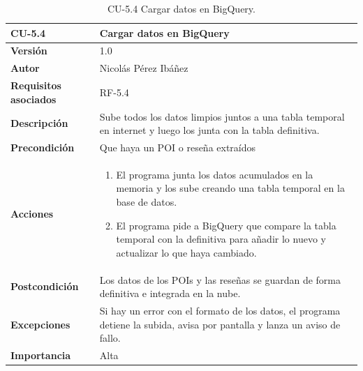 \begin{table}[p]
	\centering
	\begin{tabularx}{\linewidth}{ p{} p{} }
		\toprule
		\textbf{CU-5.4}  & \textbf{Cargar datos en BigQuery}\\
		\toprule
		\textbf{Versión}              & 1.0    \\
		\textbf{Autor}                & Nicolás Pérez Ibáñez \\
		\textbf{Requisitos asociados} & RF-5.4 \\
		\textbf{Descripción}          & Sube todos los datos limpios juntos a una tabla temporal en internet y luego los junta con la tabla definitiva. \\
		\textbf{Precondición}         & Que haya un POI o reseña extraídos \\
		\textbf{Acciones}             &
		\begin{enumerate}
			\def\labelenumi{\arabic{enumi}.}
			\tightlist
			\item El programa junta los datos acumulados en la memoria y los sube creando una tabla temporal en la base de datos.
			\item El programa pide a BigQuery que compare la tabla temporal con la definitiva para añadir lo nuevo y actualizar lo que haya cambiado.
		\end{enumerate}\\
		\textbf{Postcondición}        & Los datos de los POIs y las reseñas se guardan de forma definitiva e integrada en la nube. \\
		\textbf{Excepciones}          & Si hay un error con el formato de los datos, el programa detiene la subida, avisa por pantalla y lanza un aviso de fallo. \\
		\textbf{Importancia}          & Alta \\
		\bottomrule
	\end{tabularx}
	\caption{CU-5.4 Cargar datos en BigQuery.}
\end{table}

